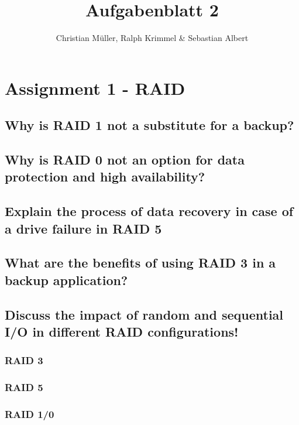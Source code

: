 \documentclass{article}
\begin{document}
\title{Aufgabenblatt 2}
\author{Christian Müller, Ralph Krimmel \& Sebastian Albert }
\maketitle

\section*{Assignment 1 - RAID}

\subsection{Why is RAID 1 not a substitute for a backup?}

\subsection{Why is RAID 0 not an option for data protection and high availability?}

\subsection{Explain the process of data recovery in case of a drive failure in RAID 5}

\subsection{What are the benefits of using RAID 3 in a backup application?}

\subsection{Discuss the impact of random and sequential I/O in different RAID configurations!}
\subsubsection*{RAID 3}

\subsubsection*{RAID 5}

\subsubsection*{RAID 1/0}
\end{document}
